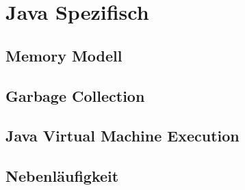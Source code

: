 \documentclass[../main.tex]{subfiles}
\begin{document}
	
	\section{Java Spezifisch}
	
	\subsection{Memory Modell}
	\clearpage
	
	\subsection{Garbage Collection}
	\clearpage
	
	\subsection{Java Virtual Machine Execution}
	\clearpage
	
	\subsection{Nebenläufigkeit}
	\clearpage
	
\end{document}
